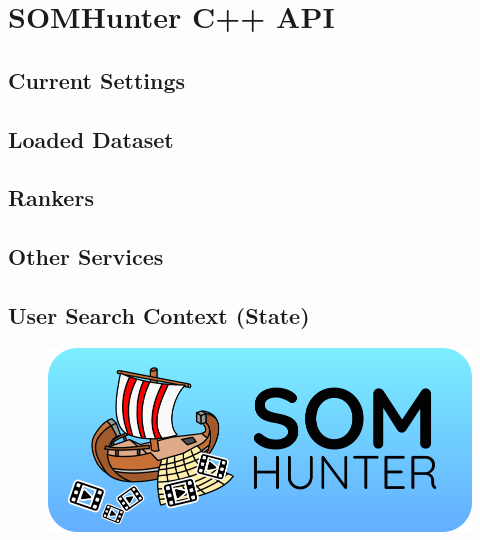 \chapter{SOMHunter C++ API}
\label{comp-cpp-api}

\section{Current Settings}

\section{Loaded Dataset}

\section{Rankers}

\section{Other Services}

\section{User Search Context (State)}


\begin{figure}
	\centering
	\includegraphics[width=\textwidth]{img/somhunter-logo.png}
	\label{fig:logo}
\end{figure}
